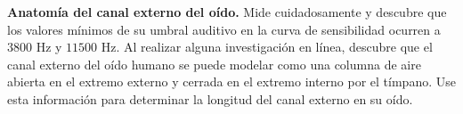 \item \textbf{Anatomía del canal externo del oído.}
Mide cuidadosamente y descubre que los valores mínimos de su umbral auditivo en la curva de sensibilidad ocurren a $3800\text{ Hz}$ y $11500\text{ Hz}$. Al realizar alguna investigación en línea, descubre que el canal externo del oído humano se puede modelar como una columna de aire abierta en el extremo externo y cerrada en el extremo interno por el tímpano. Use esta información para determinar la longitud del canal externo en su oído.